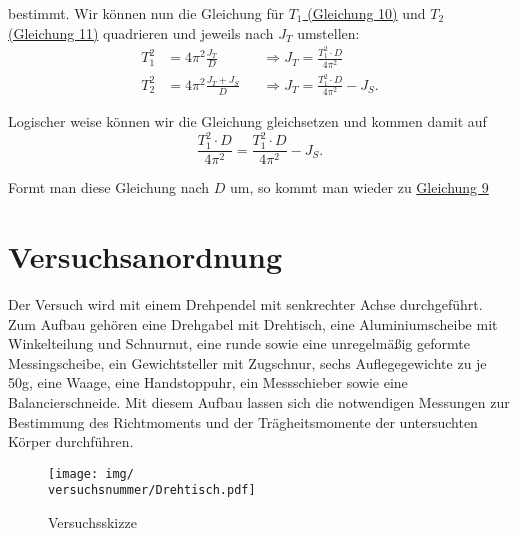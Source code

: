 bestimmt. Wir können nun die Gleichung für \hyperref[eq:T_def]{$T_1$ (Gleichung 10)} und \hyperref[eq:T_def]{$T_2$ (Gleichung 11)} quadrieren und jeweils nach $J_T$ umstellen:
\begin{align}
    T_1^2 &= 4\pi^2 \frac{J_T}{D} &&\Rightarrow J_T = \frac{T_1^2 \cdot D}{4\pi^2} \\
    T_2^2 &= 4\pi^2 \frac{J_T+J_S}{D} &&\Rightarrow J_T = \frac{T_1^2 \cdot D}{4\pi^2} - J_S.
    \label{eq:traegheitsmoment_tisch}
\end{align}

Logischer weise können wir die Gleichung gleichsetzen und kommen damit auf 
\begin{equation}
    \frac{T_1^2 \cdot D}{4\pi^2} = \frac{T_1^2 \cdot D}{4\pi^2} - J_S.
\end{equation}

Formt man diese Gleichung nach $D$ um, so kommt man wieder zu \hyperref[eq:richtmoment_rechnen]{Gleichung 9}


\section{Versuchsanordnung}
Der Versuch wird mit einem Drehpendel mit senkrechter Achse durchgeführt. Zum Aufbau gehören eine Drehgabel mit Drehtisch, eine Aluminiumscheibe mit Winkelteilung und Schnurnut, eine runde sowie eine unregelmäßig geformte Messingscheibe, ein Gewichtsteller mit Zugschnur, sechs Auflegegewichte zu je 50g, eine Waage, eine Handstoppuhr, ein Messschieber sowie eine Balancierschneide. Mit diesem Aufbau lassen sich die notwendigen Messungen zur Bestimmung des Richtmoments und der Trägheitsmomente der untersuchten Körper durchführen.

\begin{figure}[h!]
    \centering
    \texttt{[image: img/\\versuchsnummer/Drehtisch.pdf]}
    \caption{Versuchsskizze}
    \label{fig:drehtisch}
\end{figure}